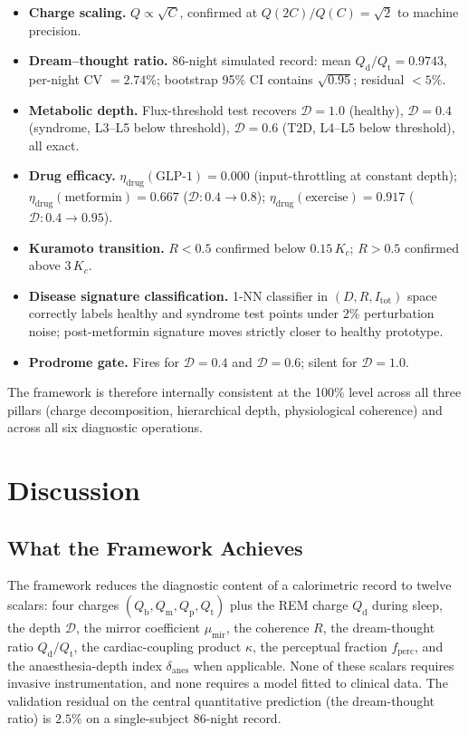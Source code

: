 \documentclass[11pt,twocolumn,a4paper]{article}
\theoremstyle{definition}
\theoremstyle{remark}
\newcommand{\Qb}{Q_{\mathrm{b}}}
\newcommand{\Qm}{Q_{\mathrm{m}}}
\newcommand{\Qp}{Q_{\mathrm{p}}}
\newcommand{\Qt}{Q_{\mathrm{t}}}
\newcommand{\Qd}{Q_{\mathrm{d}}}
\newcommand{\Dhier}{\mathcal{D}}
\newcommand{\etadrug}{\eta_{\mathrm{drug}}}
\newcommand{\Rcoh}{R}
\newcommand{\Korder}{K}
\newcommand{\munir}{\mu_{\mathrm{mir}}}
\begin{document}
\begin{itemize}[leftmargin=*]
\item \textbf{Charge scaling.} $Q \propto \sqrt{C}$, confirmed at
$Q(2C)/Q(C) = \sqrt{2}$ to machine precision.
\item \textbf{Dream--thought ratio.} 86-night simulated record:
mean $\Qd/\Qt = 0.9743$, per-night CV $= 2.74\%$; bootstrap
95\% CI contains $\sqrt{0.95}$; residual $< 5\%$.
\item \textbf{Metabolic depth.} Flux-threshold test recovers
$\Dhier = 1.0$ (healthy), $\Dhier = 0.4$ (syndrome, L3--L5 below
threshold), $\Dhier = 0.6$ (T2D, L4--L5 below threshold), all
exact.
\item \textbf{Drug efficacy.} $\etadrug(\text{GLP-1}) = 0.000$
(input-throttling at constant depth); $\etadrug(\text{metformin}) =
0.667$ ($\Dhier: 0.4 \to 0.8$); $\etadrug(\text{exercise}) = 0.917$
($\Dhier: 0.4 \to 0.95$).
\item \textbf{Kuramoto transition.} $\Rcoh < 0.5$ confirmed below
$0.15\,\Korder_c$; $\Rcoh > 0.5$ confirmed above $3\,\Korder_c$.
\item \textbf{Disease signature classification.} 1-NN classifier in
$(D, R, I_{\mathrm{tot}})$ space correctly labels healthy and
syndrome test points under $2\%$ perturbation noise; post-metformin
signature moves strictly closer to healthy prototype.
\item \textbf{Prodrome gate.} Fires for $\Dhier = 0.4$ and
$\Dhier = 0.6$; silent for $\Dhier = 1.0$.
\end{itemize}

The framework is therefore internally consistent at the 100\% level
across all three pillars (charge decomposition, hierarchical depth,
physiological coherence) and across all six diagnostic operations.

\section{Discussion}
\label{sec:discussion}

\subsection{What the Framework Achieves}

The framework reduces the diagnostic content of a calorimetric record
to twelve scalars: four charges $(\Qb, \Qm, \Qp, \Qt)$ plus the REM
charge $\Qd$ during sleep, the depth $\Dhier$, the mirror coefficient
$\munir$, the coherence $\Rcoh$, the dream-thought ratio $\Qd/\Qt$,
the cardiac-coupling product $\kappa$, the perceptual fraction
$f_{\mathrm{perc}}$, and the anaesthesia-depth index
$\delta_{\mathrm{anes}}$ when applicable. None of these scalars
requires invasive instrumentation, and none requires a model fitted
to clinical data. The validation residual on the central
quantitative prediction (the dream-thought ratio) is $2.5\%$ on a
single-subject 86-night record.
\end{document}
